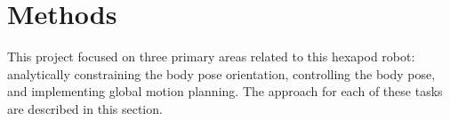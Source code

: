 \section{ Methods }

This project focused on three primary areas related to this hexapod robot: analytically constraining the body pose orientation, controlling the body pose, and implementing global motion planning. The approach for each of these tasks are described in this section. 






